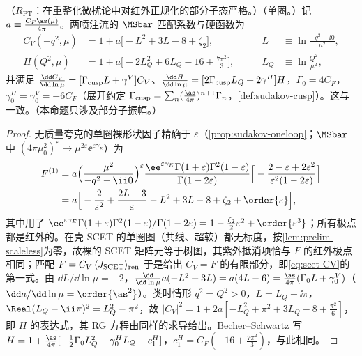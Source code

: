 \begin{proposition}\label{prop:scet-hard-matching}
（$R_{\mathrm{PT}}$：在重整化微扰论中对红外正规化的部分子态严格。）（单圈。）记 $a\equiv\frac{C_F\as(\mu)}{4\pi}$。两喷注流的 $\MSbar$ 匹配系数与硬函数为
\begin{equation}\label{eq:scet-CV}
\begin{aligned}
C_V(-q^2,\mu)&=1+a\big[-L^2+3L-8+\zeta_2\big],&\qquad L&\equiv\ln\frac{-q^2-\ii0}{\mu^2},\\
H(Q^2,\mu)&=1+a\Big[-2L_Q^2+6L_Q-16+\frac{7\pi^2}{3}\Big],&\qquad L_Q&\equiv\ln\frac{Q^2}{\mu^2},
\end{aligned}
\end{equation}
并满足 $\frac{\dd C_V}{\dd\ln\mu}=[\Gamma_{\rm cusp}L+\gamma^V]C_V$、$\frac{\dd H}{\dd\ln\mu}=[2\Gamma_{\rm cusp}L_Q+2\gamma^H]H$，$\Gamma_0=4C_F$，$\gamma^H_0=\gamma^V_0=-6C_F$（展开约定 $\Gamma_{\rm cusp}=\sum_n(\frac{\as}{4\pi})^{n+1}\Gamma_n$，\cref{def:sudakov-cusp}）。这与\cite[附录~B]{BecherSchwartz2008}一致。（本命题只涉及部分子振幅。）
\end{proposition}

\begin{proof}
无质量夸克的单圈裸形状因子精确于 $\varepsilon$（\cref{prop:sudakov-oneloop}；$\MSbar$ 中 $(4\pi\mu_0^2)^\varepsilon\to\mu^{2\varepsilon}\ee^{\varepsilon\gamma_E}$）为
\[
\begin{aligned}
F^{(1)}&=a\Big(\frac{\mu^2}{-q^2-\ii0}\Big)^{\varepsilon}\frac{\ee^{\varepsilon\gamma_E}\Gamma(1+\varepsilon)\Gamma^2(1-\varepsilon)}{\Gamma(1-2\varepsilon)}\Big[-\frac{2-\varepsilon+2\varepsilon^2}{\varepsilon^2(1-2\varepsilon)}\Big]\\
&=a\Big[-\frac{2}{\varepsilon^2}+\frac{2L-3}{\varepsilon}-L^2+3L-8+\zeta_2+\order{\varepsilon}\Big],
\end{aligned}
\]
其中用了 $\ee^{\varepsilon\gamma_E}\Gamma(1+\varepsilon)\Gamma^2(1-\varepsilon)/\Gamma(1-2\varepsilon)=1-\frac{\zeta_2}{2}\varepsilon^2+\order{\varepsilon^3}$；所有极点都是红外的。在壳 SCET 的单圈图（共线、超软）都无标度，按\cref{lem:prelim-scaleless}为零，故裸的 SCET 矩阵元等于树图，其紫外抵消项恰与 $F$ 的红外极点相同；匹配 $F=C_V\,\langle J_{\rm SCET}\rangle_{\rm ren}$ 于是给出 $C_V=F$ 的有限部分，即\cref{eq:scet-CV}的第一式。由 $\dd L/\dd\ln\mu=-2$，$\frac{\dd}{\dd\ln\mu}a(-L^2+3L)=a(4L-6)=\frac{\as}{4\pi}(\Gamma_0L+\gamma^V_0)$（$\dd a/\dd\ln\mu=\order{\as^2}$）。类时情形 $q^2=Q^2>0$，$L=L_Q-\ii\pi$，$\Real(L_Q-\ii\pi)^2=L_Q^2-\pi^2$，故 $|C_V|^2=1+2a[-L_Q^2+\pi^2+3L_Q-8+\frac{\pi^2}{6}]$，即 $H$ 的表达式，其 RG 方程由同样的求导给出。Becher--Schwartz 写 $H=1+\frac{\as}{4\pi}[-\frac12\Gamma_0L_Q^2-\gamma^H_0L_Q+c^H_1]$，$c^H_1=C_F(-16+\frac{7\pi^2}{3})$，与此相同。
\end{proof}

